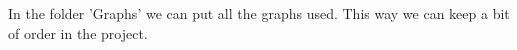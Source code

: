 In the folder 'Graphs' we can put all the graphs used.
This way we can keep a bit of order in the project.